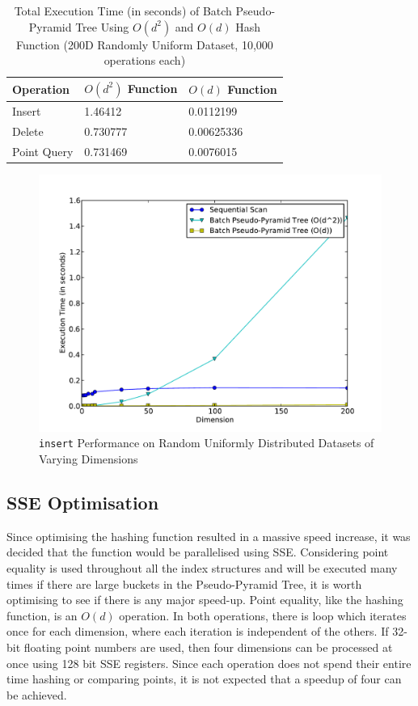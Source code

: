\begin{table}
	\centering
	\begin{tabular}{|l|l|l|}
		\hline
		\textbf{Operation} & \textbf{$O(d^2)$ Function} & \textbf{$O(d)$ Function} \\
		\hline
		Insert & 1.46412 & 0.0112199 \\
		Delete & 0.730777 & 0.00625336 \\
		Point Query & 0.731469 & 0.0076015 \\
		\hline
	\end{tabular}
	\caption{Total Execution Time (in seconds) of Batch Pseudo-Pyramid Tree Using $O(d^2)$ and $O(d)$ Hash Function (200D Randomly Uniform Dataset, 10,000 operations each)}
	\label{tab:new-pseudo-pyramid-hash}
\end{table}

\begin{figure}
	\centering
	\includegraphics[scale=0.5]{figures/performance_analysis/iteration_2/new_pseudo-pyramid_hash_performance.pdf}
	\caption{\texttt{insert} Performance on Random Uniformly Distributed Datasets of Varying Dimensions}
	\label{fig:new-pseudo-pyramid-hash}
\end{figure}

\subsection{SSE Optimisation}

Since optimising the hashing function resulted in a massive speed increase, it was decided that the function would be parallelised using SSE. Considering point equality is used throughout all the index structures and will be executed many times if there are large buckets in the Pseudo-Pyramid Tree, it is worth optimising to see if there is any major speed-up. Point equality, like the hashing function, is an $O(d)$ operation. In both operations, there is loop which iterates once for each dimension, where each iteration is independent of the others. If 32-bit floating point numbers are used, then four dimensions can be processed at once using 128 bit SSE registers. Since each operation does not spend their entire time hashing or comparing points, it is not expected that a speedup of four can be achieved.

